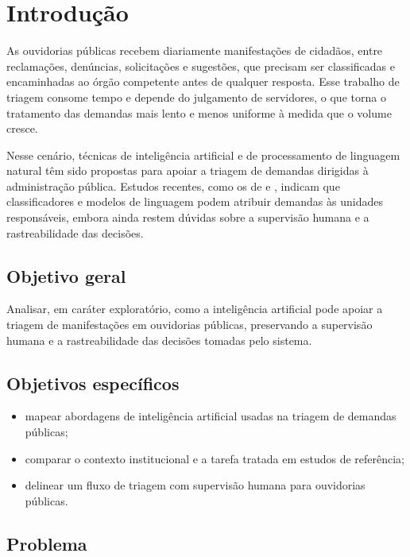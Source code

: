 
\section{Introdução}

As ouvidorias públicas recebem diariamente manifestações de cidadãos, entre reclamações, denúncias, solicitações e sugestões, que precisam ser classificadas e encaminhadas ao órgão competente antes de qualquer resposta. Esse trabalho de triagem consome tempo e depende do julgamento de servidores, o que torna o tratamento das demandas mais lento e menos uniforme à medida que o volume cresce.

Nesse cenário, técnicas de inteligência artificial e de processamento de linguagem natural têm sido propostas para apoiar a triagem de demandas dirigidas à administração pública. Estudos recentes, como os de  e , indicam que classificadores e modelos de linguagem podem atribuir demandas às unidades responsáveis, embora ainda restem dúvidas sobre a supervisão humana e a rastreabilidade das decisões.

\subsection{Objetivo geral}

Analisar, em caráter exploratório, como a inteligência artificial pode apoiar a triagem de manifestações em ouvidorias públicas, preservando a supervisão humana e a rastreabilidade das decisões tomadas pelo sistema.

\subsection{Objetivos específicos}

\begin{itemize}
  \item mapear abordagens de inteligência artificial usadas na triagem de demandas públicas;
  \item comparar o contexto institucional e a tarefa tratada em estudos de referência;
  \item delinear um fluxo de triagem com supervisão humana para ouvidorias públicas.
\end{itemize}

\subsection{Problema}

